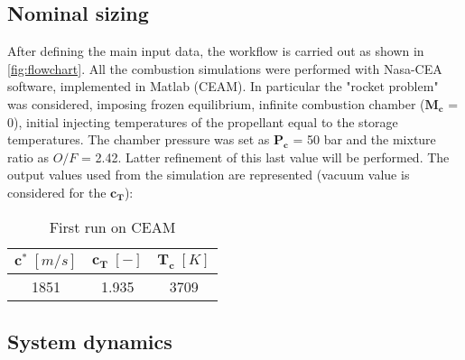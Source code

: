 \subsection{Nominal sizing}
\label{subsec:nominal}
After defining the main input data, the workflow is carried out as shown in \autoref{fig:flowchart}. All the combustion simulations were performed with Nasa-CEA software, implemented in Matlab (CEAM). In particular the "rocket problem" was considered, imposing frozen equilibrium, infinite combustion chamber ($\boldsymbol{M_c}$ = 0), initial injecting temperatures of the propellant equal to the storage temperatures. The chamber pressure was set as $\boldsymbol{P_c}$ = 50 bar and the mixture ratio as $O/F$ = 2.42. Latter refinement of this last value will be performed. The output values used from the simulation are represented (vacuum value is considered for the $\boldsymbol{c_T}$):
\begin{table}[H]
    \renewcommand{\arraystretch}{1.2}
    \centering
    \begin{tabular}{|c|c|c|}
        \hline
        $\boldsymbol{c^*} \; [m/s]$ & $\boldsymbol{c_T} \; [-]$ & $\boldsymbol{T_c} \; [K]$ \\
        \hline
        1851 & 1.935 & 3709  \\
        \hline
    \end{tabular}
    \caption{First run on CEAM}
    \label{table:out_CEA_1}
\end{table}






\subsection{System dynamics}
\label{subsec:dynamics}

